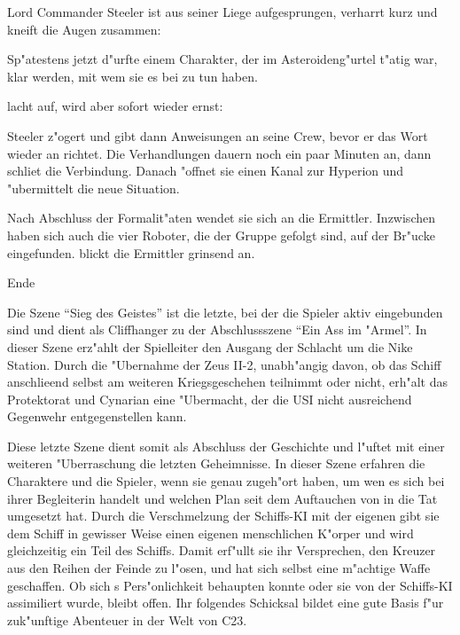 Lord Commander Steeler ist aus seiner Liege aufgesprungen, verharrt kurz und kneift die Augen zusammen:


Sp"atestens jetzt d"urfte einem Charakter, der im Asteroideng"urtel t"atig war, klar werden, mit wem sie es bei \xl{} zu tun haben.

\xl{} lacht auf, wird aber sofort wieder ernst:


Steeler z"ogert und gibt dann Anweisungen an seine Crew, bevor er das Wort wieder an \xl{} richtet. Die Verhandlungen dauern noch ein paar Minuten an, dann schlie\3t \xl{} die Verbindung. Danach "offnet sie einen Kanal zur Hyperion und "ubermittelt die neue Situation.

Nach Abschluss der Formalit"aten wendet sie sich an die Ermittler. Inzwischen haben sich auch die vier Roboter, die der Gruppe gefolgt sind, auf der Br"ucke eingefunden. \xl{} blickt die Ermittler grinsend an.


\begin{remarks}
	\begin{center}\huge{}Ende\end{center}

	Die Szene ``Sieg des Geistes'' ist die letzte, bei der die Spieler aktiv eingebunden sind und dient als Cliffhanger zu der Abschlussszene ``Ein Ass im "Armel''. In dieser Szene erz"ahlt der Spielleiter den Ausgang der Schlacht um die Nike Station. Durch die "Ubernahme der Zeus II-2, unabh"angig davon, ob das Schiff anschlie\3end selbst am weiteren Kriegsgeschehen teilnimmt oder nicht, erh"alt das Protektorat und Cynarian eine "Ubermacht, der die USI nicht ausreichend Gegenwehr entgegenstellen kann.

	Diese letzte Szene dient somit als Abschluss der Geschichte und l"uftet mit einer weiteren "Uberraschung die letzten Geheimnisse. In dieser Szene erfahren die Charaktere und die Spieler, wenn sie genau zugeh"ort haben, um wen es sich bei ihrer Begleiterin handelt und welchen Plan \xl{} seit dem Auftauchen von \ml{} in die Tat umgesetzt hat. Durch die Verschmelzung der Schiffs-KI mit der eigenen gibt sie dem Schiff in gewisser Weise einen eigenen menschlichen K"orper und wird gleichzeitig ein Teil des Schiffs. Damit erf"ullt sie ihr Versprechen, den Kreuzer aus den Reihen der Feinde zu l"osen, und hat sich selbst eine m"achtige Waffe geschaffen. Ob sich \xl{}s Pers"onlichkeit behaupten konnte oder sie von der Schiffs-KI assimiliert wurde, bleibt offen. Ihr folgendes Schicksal bildet eine gute Basis f"ur zuk"unftige Abenteuer in der Welt von C23.
\end{remarks}
\vfill\pagebreak
